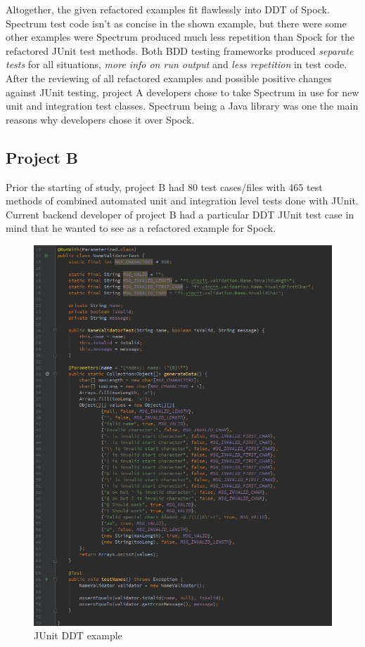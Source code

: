     Altogether, the given refactored examples fit flawlessly into DDT of Spock. Spectrum test code isn't as concise in the shown example,
    but there were some other examples were Spectrum produced much less repetition than Spock for the refactored JUnit test methods.
    Both BDD testing frameworks produced \textit{separate tests} for all situations, \textit{more info on run output} and \textit{less repetition} in test code.
    After the reviewing of all refactored examples and possible positive changes against JUnit testing, project A developers chose to take
    Spectrum in use for new unit and integration test classes. Spectrum being a Java library was one the main reasons
    why developers chose it over Spock.
    \clearpage
    \subsection{Project B}
    Prior the starting of study, project B had 80 test cases/files with 465 test methods of combined automated unit and integration level tests done with JUnit.
    Current backend developer of project B had a particular DDT JUnit test case in mind that he wanted to see as a refactored example
    for Spock.

    \begin{figure}[H]
      \begin{center}
        \includegraphics[width=12.7cm]{images/junit-validator-example.png}
        \caption{JUnit DDT example}
        \label{fig:junit-bit-example}
      \end{center}
    \end{figure}

